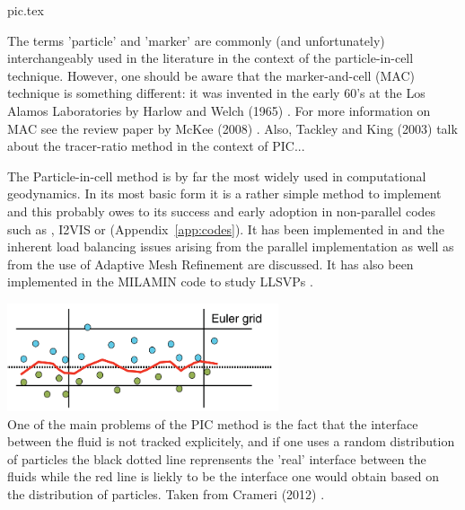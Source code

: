 \begin{flushright} {\tiny {\color{gray} pic.tex}} \end{flushright}

\begin{remark}
The terms 'particle' and 'marker' are commonly (and unfortunately) interchangeably used in the literature 
in the context of the particle-in-cell technique. However, one should be aware that the marker-and-cell (MAC) 
technique is something different: it was invented in the early 60's at the Los Alamos Laboratories by 
Harlow and Welch (1965) \cite{hawe65}. For more information on MAC see the review paper 
by McKee \etal (2008) \cite{mctf08}. 
Also, Tackley and King (2003) \cite{taki03} talk about the tracer-ratio method in the context of PIC... 
\end{remark}

The Particle-in-cell method is by far the most widely used in computational geodynamics. 
In its most basic form it is a rather simple method to implement and this probably owes to its success
and early adoption \cite{popo92}  in non-parallel codes such as \sopale \cite{full95}, 
I2VIS \cite{geyu03} or \citcoms \cite{mczh04} (Appendix~\ref{app:codes}).
It has been implemented in \aspect{} \cite{galh18} and the inherent load balancing issues arising from the 
parallel implementation as well as from the use of Adaptive Mesh Refinement are discussed. 
It has also been implemented in the MILAMIN code \cite{daks08} to study LLSVPs \cite{musd15}.

\begin{center}
\includegraphics[width=8cm]{images/tracking/crsg12}\\
{\captionfont One of the main problems of the PIC method is the fact that the interface 
between the fluid is not tracked explicitely, and if one uses a random distribution of 
particles the black dotted line reprensents the 'real' interface between the fluids 
while the red line is liekly to be the interface one would obtain based on the 
distribution of particles. Taken from Crameri \etal (2012) \cite{crsg12}.}
\end{center}

